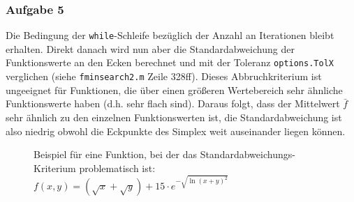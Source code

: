 \documentclass[a4paper, 12pt]{report}
\begin{document}
\subsubsection{Aufgabe 5}
Die Bedingung der \lstinline[basicstyle=\ttfamily\color{black}]|while|-Schleife bezüglich der Anzahl an Iterationen bleibt
erhalten. Direkt danach wird nun aber die Standardabweichung der Funktionswerte an den Ecken berechnet und mit der Toleranz
\lstinline[basicstyle=\ttfamily\color{black}]|options.TolX| verglichen (siehe
\lstinline[basicstyle=\ttfamily\color{black}]|fminsearch2.m| Zeile 328ff). Dieses Abbruchkriterium ist ungeeignet für Funktionen,
die über einen größeren Wertebereich sehr ähnliche Funktionswerte haben (d.h. sehr flach sind). Daraus folgt, dass der Mittelwert
$\bar f$ sehr ähnlich zu den einzelnen Funktionswerten ist, die Standardabweichung ist also niedrig obwohl die Eckpunkte des Simplex
weit auseinander liegen können.
\begin{figure}[H]
  \centering
  \caption{Beispiel für eine Funktion, bei der das Standardabweichungs-Kriterium problematisch ist: $f(x,y) = (\sqrt{x} + \sqrt{y}) + 15\cdot e^{-\sqrt{\ln(x+y)^2}}$}
\end{figure}
\end{document}
